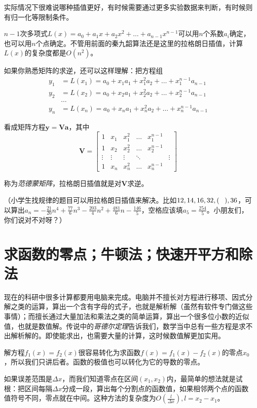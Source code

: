 实际情况下很难说哪种插值更好，有时候需要通过更多实验数据来判断，有时候则有归一化等限制条件。

$n-1$次多项式$L(x)=a_0+a_1 x+a_2 x^2+\dots+a_{n-1} x^{n-1}$可以用$n$个系数$a_i$确定，也可以用$n$个点确定。不管用前面的秦九韶算法还是这里的拉格朗日插值，计算$L(x)$的复杂度都是$O(n^2)$。

如果你熟悉矩阵的求逆，还可以这样理解：把方程组
\begin{align*}
y_1&=L(x_1)=a_0+x_1 a_1+x_1^2 a_2+\dots+x_1^{n-1} a_{n-1} \\
y_2&=L(x_2)=a_0+x_2 a_1+x_2^2 a_2+\dots+x_2^{n-1} a_{n-1} \\
&\dots \\
y_n&=L(x_n)=a_0+x_n a_1+x_n^2 a_2+\dots+x_n^{n-1} a_{n-1}
\end{align*}

看成矩阵方程$\mathbf{y}=\mathbf{V} \mathbf{a}$，其中
\begin{equation*}
\mathbf{V}=\begin{bmatrix}
1 & x_1 & x_1^2 & \dots & x_1^{n-1} \\
1 & x_2 & x_2^2 & \dots & x_2^{n-1} \\
\vdots & \vdots & \vdots & \ddots & & \vdots \\
1 & x_n & x_n^2 & \dots & x_n^{n-1}
\end{bmatrix}
\end{equation*}

称为\emph{范德蒙矩阵}，拉格朗日插值就是对$\mathbf{V}$求逆。

（小学生找规律的题目可以用拉格朗日插值来解决。比如$12,14,16,32,(\pheq),36$，可以算出$a_n=-\frac{21}{20} n^4+\frac{77}{6} n^3-\frac{203}{4} n^2+\frac{481}{6} n-\frac{146}{5}$，空格应该填$a_5=\frac{254}{5}$。小朋友们，你们说对不对呀？）
\section{求函数的零点；牛顿法；快速开平方和除法}
现在的科研中很多计算都要用电脑来完成。电脑并不擅长对方程进行移项、因式分解之类的运算，算出一个含有字母的式子，也就是解析解（虽然有软件专门做这些事情）；而擅长通过大量加法和乘法之类的简单运算，算出一个很多位小数的近似值，也就是数值解。传说中的\emph{哥德尔定理}告诉我们，数学当中总有一些方程是求不出解析解的。即使能求出，也需要大量的计算，这时候数值解更加实用。

解方程$f_1(x)=f_2(x)$很容易转化为求函数$f(x)=f_1(x)-f_2(x)$的零点$x_0$，所以我们只讲后者。函数的极值也可以转化为它的导数的零点。

如果误差范围是$\Delta x$，而我们知道零点在区间$(x_1,x_2)$内，最简单的想法就是试根：把区间每隔$\Delta x$分成一段，算出每个分割点的函数值，如果相邻两个点的函数值符号不同，零点就在中间。这种方法的复杂度为$O(\frac{l}{\Delta x}),l=x_2-x_1$。

